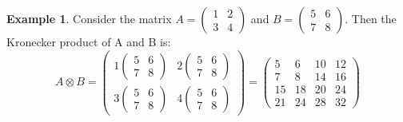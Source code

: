 \documentclass[12pt, oneside]{book}
\theoremstyle{definition}
\theoremstyle{definition}
\newtheorem{example}{Example}[section]
\theoremstyle{remark}
\begin{document}
\begin{example}
    Consider the matrix $A=\begin{pmatrix} 1 & 2 \\ 3 & 4 \end{pmatrix}$ and $B=\begin{pmatrix} 5 & 6 \\ 7 & 8 \end{pmatrix}$. Then the Kronecker product of A and B is:
    \[ A \otimes B = \begin{pmatrix} 1 \begin{pmatrix} 5 & 6 \\ 7 & 8 \end{pmatrix} & 2 \begin{pmatrix} 5 & 6 \\ 7 & 8 \end{pmatrix} \\ 3 \begin{pmatrix} 5 & 6 \\ 7 & 8 \end{pmatrix} & 4 \begin{pmatrix} 5 & 6 \\ 7 & 8 \end{pmatrix} \end{pmatrix} = \begin{pmatrix} 5 & 6 & 10 & 12 \\ 7 & 8 & 14 & 16 \\ 15 & 18 & 20 & 24 \\ 21 & 24 & 28 & 32 \end{pmatrix} \]
\end{example}
\end{document}

